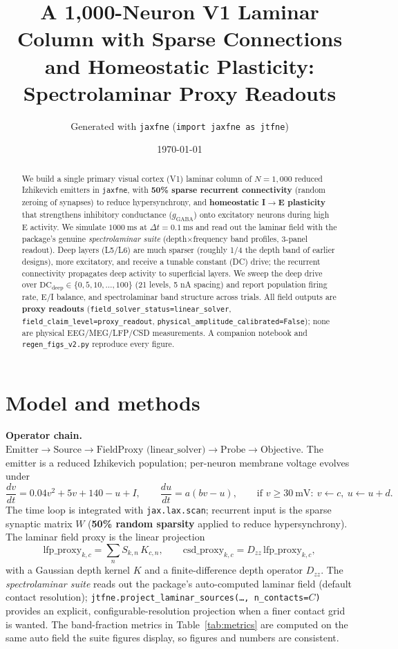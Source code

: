 \documentclass[11pt]{article}
\title{\textbf{A 1{,}000-Neuron V1 Laminar Column with Sparse Connections and Homeostatic Plasticity:\\
Spectrolaminar Proxy Readouts}}
\author{Generated with \texttt{jaxfne} (\texttt{import jaxfne as jtfne})}
\date{\today}
\begin{document}
\maketitle

\begin{abstract}
We build a single primary visual cortex (V1) laminar column of $N=1{,}000$ reduced
Izhikevich emitters in \texttt{jaxfne}, with \textbf{50\% sparse recurrent connectivity}
(random zeroing of synapses) to reduce hypersynchrony, and \textbf{homeostatic I$\to$E
plasticity} that strengthens inhibitory conductance ($g_{\text{GABA}}$) onto excitatory neurons
during high E activity. We simulate $1000~\mathrm{ms}$ at $\Delta t = 0.1~\mathrm{ms}$ and read
out the laminar field with the package's genuine \emph{spectrolaminar suite}
(depth$\times$frequency band profiles, 3-panel readout). Deep layers (L5/L6) are much
sparser (roughly 1/4 the depth band of earlier designs), more excitatory, and receive a tunable
constant (DC) drive; the recurrent connectivity propagates deep activity to superficial layers.
We sweep the deep drive over $\mathrm{DC}_{\text{deep}}\in\{0, 5, 10, \ldots, 100\}$ (21 levels, 5 nA spacing) and report
population firing rate, E/I balance, and spectrolaminar band structure across trials.
All field outputs are \textbf{proxy readouts}
(\texttt{field\_solver\_status=linear\_solver}, \texttt{field\_claim\_level=proxy\_readout},
\texttt{physical\_amplitude\_calibrated=False}); none are physical EEG/MEG/LFP/CSD
measurements. A companion notebook and \texttt{regen\_figs\_v2.py} reproduce every figure.
\end{abstract}

\tableofcontents

\section{Model and methods}
\textbf{Operator chain.}
$\text{Emitter}\to\text{Source}\to\text{FieldProxy (linear\_solver)}\to\text{Probe}\to\text{Objective}$.
The emitter is a reduced Izhikevich population; per-neuron membrane voltage evolves under
\[
\frac{dv}{dt}=0.04 v^2 + 5v + 140 - u + I,\qquad
\frac{du}{dt}=a(bv-u),\qquad
\text{if } v\ge 30~\mathrm{mV}:~v\leftarrow c,~u\leftarrow u+d .
\]
The time loop is integrated with \texttt{jax.lax.scan}; recurrent input is the sparse
synaptic matrix $W$ (\textbf{50\% random sparsity} applied to reduce hypersynchrony). The laminar field proxy is the linear projection
\[
\mathrm{lfp\_proxy}_{k,c}=\sum_n S_{k,n}\,K_{c,n},\qquad
\mathrm{csd\_proxy}_{k,c}=D_{zz}\,\mathrm{lfp\_proxy}_{k,c},
\]
with a Gaussian depth kernel $K$ and a finite-difference depth operator $D_{zz}$. The
\emph{spectrolaminar suite} reads out the package's auto-computed laminar field (default
contact resolution); \texttt{jtfne.project\_laminar\_sources(\ldots, n\_contacts=$C$)}
provides an explicit, configurable-resolution projection when a finer contact grid is
wanted. The band-fraction metrics in Table~\ref{tab:metrics} are computed on the same
auto field the suite figures display, so figures and numbers are consistent.
\end{document}
